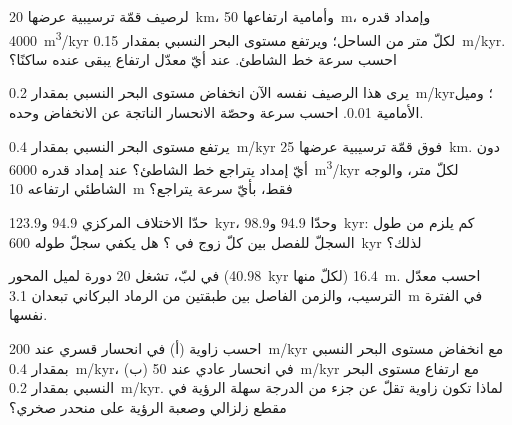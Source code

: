 \begin{exercise}[$\star\star$]\label{exo:b3:sequence-stratigraphy:5}
لرصيف قمّة ترسيبية عرضها \qty{20}{km}، وأمامية ارتفاعها \qty{50}{m}،
وإمداد قدره \qty{4000}{m^3/kyr} لكلّ متر من الساحل؛ ويرتفع مستوى البحر النسبي
بمقدار \qty{0.15}{m/kyr}. احسب سرعة خط الشاطئ. عند أيّ معدّل
ارتفاع يبقى عنده ساكنًا؟
\end{exercise}

\begin{exercise}[$\star\star$]\label{exo:b3:sequence-stratigraphy:6}
يرى هذا الرصيف نفسه الآن انخفاض مستوى البحر النسبي بمقدار \qty{0.2}{m/kyr}؛
وميل الأمامية 0.01. احسب سرعة 
وحصّة الانحسار الناتجة عن الانخفاض وحده.
\end{exercise}

\begin{exercise}[$\star\star$]\label{exo:b3:sequence-stratigraphy:7}
يرتفع مستوى البحر النسبي بمقدار \qty{0.4}{m/kyr} فوق قمّة ترسيبية عرضها \qty{25}{km}.
دون أيّ إمداد يتراجع خط الشاطئ؟ عند إمداد قدره
\qty{6000}{m^3/kyr} لكلّ متر، والوجه الشاطئي ارتفاعه \qty{10}{m} فقط، بأيّ سرعة
يتراجع؟
\end{exercise}

\begin{exercise}[$\star\star$]\label{exo:b3:sequence-stratigraphy:8}
حدّا الاختلاف المركزي 94.9 و\qty{123.9}{kyr}، وحدّا 94.9
و\qty{98.9}{kyr}: كم يلزم من طول السجلّ للفصل بين كلّ زوج في ؟
هل يكفي سجلّ طوله \qty{600}{kyr} لذلك؟
\end{exercise}

\begin{exercise}[$\star\star$]\label{exo:b3:sequence-stratigraphy:9}
في لبّ، تشغل 20 دورة لميل المحور (\qty{40.98}{kyr} لكلّ منها)
\qty{16.4}{m}. احسب معدّل الترسيب، والزمن الفاصل بين طبقتين من الرماد البركاني
تبعدان \qty{3.1}{m} في الفترة نفسها.
\end{exercise}

\begin{exercise}[$\star\star\star$]\label{exo:b3:sequence-stratigraphy:10}
احسب زاوية  (أ) في انحسار قسري عند
\qty{200}{m/kyr} مع انخفاض مستوى البحر النسبي بمقدار \qty{0.4}{m/kyr}، (ب) في
انحسار عادي عند \qty{50}{m/kyr} مع ارتفاع مستوى البحر النسبي بمقدار
\qty{0.2}{m/kyr}. لماذا تكون زاوية تقلّ عن جزء من الدرجة سهلة الرؤية في مقطع زلزالي
وصعبة الرؤية على منحدر صخري؟
\end{exercise}

